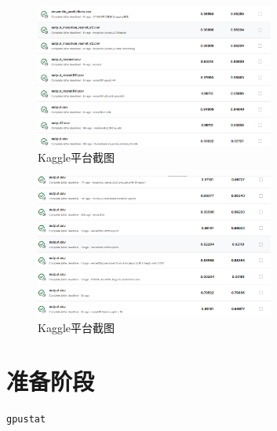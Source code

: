 \documentclass[12pt,a4paper,UTF8]{article}
\begin{document}
\begin{figure}[htbp] \centering \includegraphics[width=0.7\textwidth]{figures/2024-12-12-18-42-44.png} \caption{ Kaggle平台截图} \end{figure}

\begin{figure}[htbp] \centering \includegraphics[width=0.7\textwidth]{figures/2024-12-12-18-43-13.png} \caption{ Kaggle平台截图 }\end{figure}

\section{准备阶段}


\begin{lstlisting}[language=Python, caption=查看显卡信息]
gpustat
\end{lstlisting}
\end{document}
